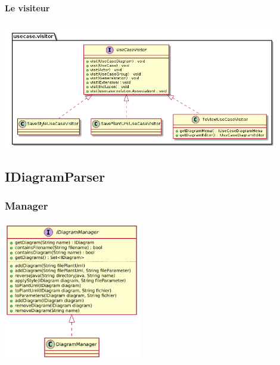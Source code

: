 \documentclass[a4paper,10pt]{article}
\begin{document}
	\paragraph{Le visiteur}
	\begin{center}
	  \includegraphics[width=12cm]{Image/useCaseVisiteur.png}
	\end{center}
      
    \subsection{IDiagramParser}
	
	\subsubsection{Manager}
	\begin{center}
	  \includegraphics[width=6cm]{Image/manager.png}
	\end{center}
	
\end{document}
